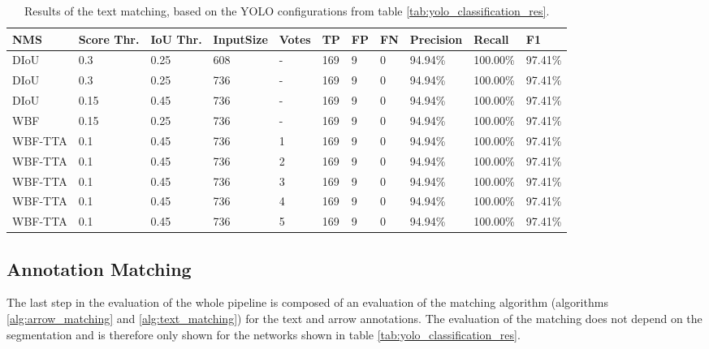 \begin{table}[H]
\footnotesize
\begin{center}
\begin{tabular}{|l|l|l|l|l|l|l|l|l|l|l|}

\hline
\textbf{NMS}     & \textbf{Score Thr.} & \textbf{IoU Thr.} & \textbf{InputSize} & \textbf{Votes} & \textbf{TP}  & \textbf{FP} & \textbf{FN} & \textbf{Precision} & \textbf{Recall}   & \textbf{F1}       \\
\hline
DIoU    & 0.3        & 0.25     & 608        & -     & 169 & 9  & 0  & 94.94\%   & 100.00\% & 97.41\%  \\
\hline
DIoU    & 0.3        & 0.25     & 736        & -     & 169 & 9  & 0  & 94.94\%   & 100.00\% & 97.41\%  \\
\hline
DIoU    & 0.15       & 0.45     & 736        & -     & 169 & 9  & 0  & 94.94\%   & 100.00\% & 97.41\%  \\
\hline
WBF     & 0.15       & 0.25     & 736        & -     & 169 & 9  & 0  & 94.94\%   & 100.00\% & 97.41\%  \\
\hline
WBF-TTA & 0.1        & 0.45     & 736        & 1     & 169 & 9  & 0  & 94.94\%   & 100.00\% & 97.41\%  \\
\hline
WBF-TTA & 0.1        & 0.45     & 736        & 2     & 169 & 9  & 0  & 94.94\%   & 100.00\% & 97.41\%  \\
\hline
WBF-TTA & 0.1        & 0.45     & 736        & 3     & 169 & 9  & 0  & 94.94\%   & 100.00\% & 97.41\%  \\
\hline
WBF-TTA & 0.1        & 0.45     & 736        & 4     & 169 & 9  & 0  & 94.94\%   & 100.00\% & 97.41\%  \\
\hline
WBF-TTA & 0.1        & 0.45     & 736        & 5     & 169 & 9  & 0  & 94.94\%   & 100.00\% & 97.41\%  \\
\hline

\end{tabular}
\caption{Results of the text matching, based on the \ac{YOLO} configurations from table \ref{tab:yolo_classification_res}.}
\label{tab:text_matching_results}
\end{center}
\end{table}

\subsection{Annotation Matching}

The last step in the evaluation of the whole pipeline is composed of an evaluation of the matching algorithm (algorithms \ref{alg:arrow_matching} and \ref{alg:text_matching}) for the text and arrow annotations.
The evaluation of the matching does not depend on the segmentation and is therefore only shown for the networks shown in table \ref{tab:yolo_classification_res}.

